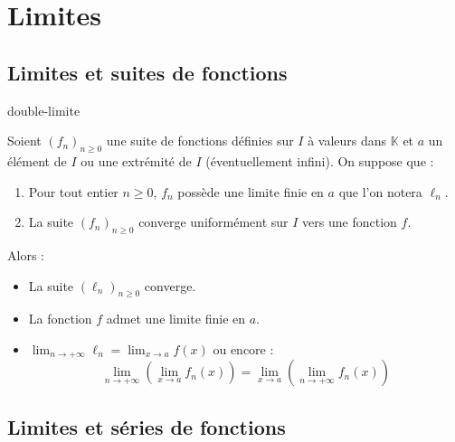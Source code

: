 \documentclass[a4paper,10pt]{report}
\begin{document}
\section{Limites}
\subsection{Limites et suites de fonctions}

\begin{Theoreme}{double-limite}

Soient $(f_n)_{n \geq 0}$ une suite de fonctions définies sur $I$ à valeurs dans $\mathbb{K}$ et $a$ un élément de $I$ ou une extrémité de $I$ (éventuellement infini). On suppose que :

\begin{enumerate}
\item Pour tout entier $n \geq 0$, $f_n$ possède une limite finie en $a$ que l'on notera $\ell_n$.
\item La suite $(f_n)_{n \geq 0}$ converge uniformément sur $I$ vers une fonction $f$.
\end{enumerate}
Alors :

\begin{itemize}
\item La suite $(\ell_n)_{n \geq 0}$ converge.
\item La fonction $f$ admet une limite finie en $a$.
\item $\lim_{n \rightarrow + \infty} \ell_n = \lim_{x \rightarrow a } f(x)$ ou encore :
$$ \lim_{n \rightarrow + \infty} \left( \lim_{x \rightarrow a} f_n(x) \right)=  \lim_{x \rightarrow a} \left(\lim_{n \rightarrow + \infty} f_n(x)\right)$$
\end{itemize}
\end{Theoreme}

\subsection{Limites et séries de fonctions}
\end{document}
